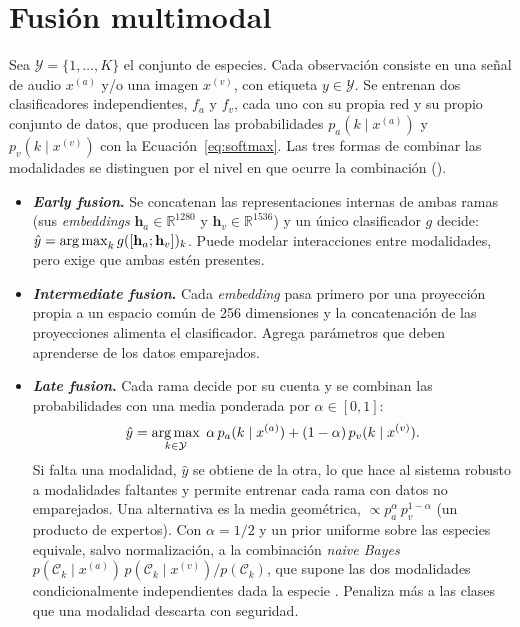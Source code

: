 \section{Fusión multimodal}\label{sec:teoria-fusion}

Sea $\mathcal{Y} = \{1, \dots, K\}$ el conjunto de especies. Cada observación
consiste en una señal de audio $x^{(a)}$ y/o una imagen $x^{(v)}$, con
etiqueta $y \in \mathcal{Y}$. Se entrenan dos clasificadores independientes,
$f_a$ y $f_v$, cada uno con su propia red y su propio conjunto de datos, que
producen las probabilidades $p_a(k \mid x^{(a)})$ y $p_v(k \mid x^{(v)})$ con
la Ecuación~\ref{eq:softmax}. Las tres formas de combinar las modalidades
\citep{baltrusaitis2019multimodal} se distinguen por el nivel en que ocurre
la combinación ().

\begin{itemize}[leftmargin=*, itemsep=2pt]
  \item \textbf{\textit{Early fusion}.} Se concatenan las representaciones
        internas de ambas ramas (sus \textit{embeddings} $\mathbf{h}_a \in
        \mathbb{R}^{1280}$ y $\mathbf{h}_v \in \mathbb{R}^{1536}$) y un único
        clasificador $g$ decide: $\hat{y} = \operatorname*{arg\,max}_k g([\mathbf{h}_a;
        \mathbf{h}_v])_k$. Puede modelar interacciones entre modalidades,
        pero exige que ambas estén presentes.
  \item \textbf{\textit{Intermediate fusion}.} Cada \textit{embedding} pasa
        primero por una proyección propia a un espacio común de 256
        dimensiones y la concatenación de las proyecciones alimenta el
        clasificador. Agrega parámetros que deben aprenderse de los datos
        emparejados.
  \item \textbf{\textit{Late fusion}.} Cada rama decide por su cuenta y se
        combinan las probabilidades con una media ponderada por $\alpha \in
        [0, 1]$:
        \begin{equation}
          \hat{y} = \operatorname*{arg\,max}_{k \in \mathcal{Y}} \;
          \alpha\, p_a(k \mid x^{(a)}) + (1-\alpha)\, p_v(k \mid x^{(v)}).
          \label{eq:fusion}
        \end{equation}
        Si falta una modalidad, $\hat{y}$ se obtiene de la otra, lo que hace
        al sistema robusto a modalidades faltantes y permite entrenar cada
        rama con datos no emparejados. Una alternativa es la media
        geométrica, $\propto p_a^{\alpha}\, p_v^{1-\alpha}$ (un producto de
        expertos). Con $\alpha = 1/2$ y un prior uniforme sobre las especies
        equivale, salvo normalización, a la combinación \textit{naive Bayes}
        $p(\mathcal{C}_k \mid x^{(a)})\, p(\mathcal{C}_k \mid x^{(v)}) /
        p(\mathcal{C}_k)$, que supone las dos modalidades condicionalmente
        independientes dada la especie \citep[pp.~146--147]{bishop2024deep}.
        Penaliza más a las clases que una modalidad descarta con seguridad.
\end{itemize}

